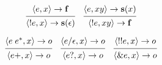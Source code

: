 \documentclass[12pt]{article}
\begin{document}
\[
  \begin{prooftree}
    \hypo{\langle e,x\rangle \to \mathbf{f}}
    \infer1{\langle !e, x\rangle \to \mathbf{s}(\epsilon)}
  \end{prooftree}
  \quad
  \begin{prooftree}
    \hypo{\langle e,xy\rangle \to \mathbf{s}(x)}
    \infer1{\langle !e,xy\rangle \to \mathbf{f}}
  \end{prooftree}
\]

\[
  \begin{prooftree}
    \hypo{\langle e\; e^*,x\rangle \to o}
    \infer1{\langle e+,x\rangle \to o}
  \end{prooftree}
  \quad
  \begin{prooftree}
    \hypo{\langle e / \epsilon,x\rangle \to o}
    \infer1{\langle e?,x\rangle \to o}
  \end{prooftree}
  \quad
  \begin{prooftree}
    \hypo{\langle !!e,x\rangle \to o}
    \infer1{\langle \& e,x\rangle \to o}
  \end{prooftree}
\]
\end{document}
